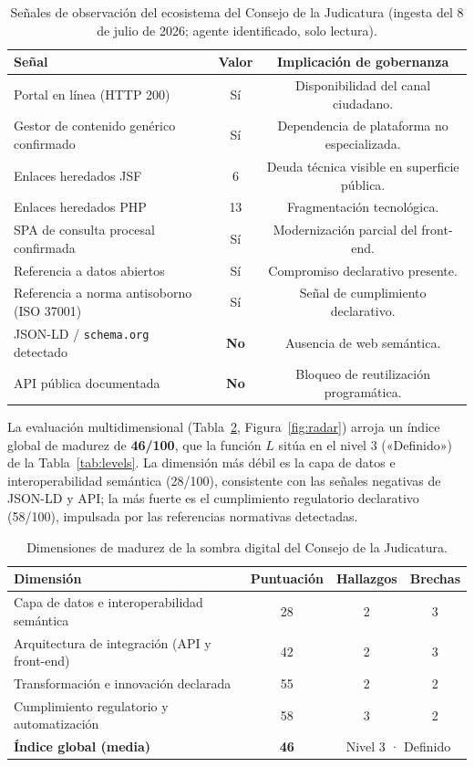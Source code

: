 \documentclass[computers,article,submit,pdftex,moreauthors]{Definitions/mdpi}
\begin{document}
\begin{table}[H]
\caption{Señales de observación del ecosistema del Consejo de la Judicatura (ingesta del 8 de julio de 2026; agente identificado, solo lectura).}
\label{tab:signals}
\begin{tabularx}{\textwidth}{Xcc}
\toprule
\textbf{Señal} & \textbf{Valor} & \textbf{Implicación de gobernanza}\\
\midrule
Portal en línea (HTTP 200) & Sí & Disponibilidad del canal ciudadano.\\
Gestor de contenido genérico confirmado & Sí & Dependencia de plataforma no especializada.\\
Enlaces heredados JSF & 6 & Deuda técnica visible en superficie pública.\\
Enlaces heredados PHP & 13 & Fragmentación tecnológica.\\
SPA de consulta procesal confirmada & Sí & Modernización parcial del front-end.\\
Referencia a datos abiertos & Sí & Compromiso declarativo presente.\\
Referencia a norma antisoborno (ISO 37001) & Sí & Señal de cumplimiento declarativo.\\
JSON-LD / \texttt{schema.org} detectado & \textbf{No} & Ausencia de web semántica.\\
API pública documentada & \textbf{No} & Bloqueo de reutilización programática.\\
\bottomrule
\end{tabularx}
\end{table}

La evaluación multidimensional (Tabla~\ref{tab:cjdims}, Figura~\ref{fig:radar}) arroja un índice global de madurez de \textbf{46/100}, que la función $L$ sitúa en el nivel 3 («Definido») de la Tabla~\ref{tab:levels}. La dimensión más débil es la capa de datos e interoperabilidad semántica (28/100), consistente con las señales negativas de JSON-LD y API; la más fuerte es el cumplimiento regulatorio declarativo (58/100), impulsada por las referencias normativas detectadas.

\begin{table}[H]
\caption{Dimensiones de madurez de la sombra digital del Consejo de la Judicatura.}
\label{tab:cjdims}
\begin{tabularx}{\textwidth}{Xccc}
\toprule
\textbf{Dimensión} & \textbf{Puntuación} & \textbf{Hallazgos} & \textbf{Brechas}\\
\midrule
Capa de datos e interoperabilidad semántica & 28 & 2 & 3\\
Arquitectura de integración (API y front-end) & 42 & 2 & 3\\
Transformación e innovación declarada & 55 & 2 & 2\\
Cumplimiento regulatorio y automatización & 58 & 3 & 2\\
\midrule
\textbf{Índice global (media)} & \textbf{46} & \multicolumn{2}{c}{Nivel 3 · Definido}\\
\bottomrule
\end{tabularx}
\end{table}
\end{document}
